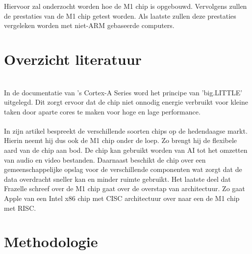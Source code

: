 \documentclass{hogent-article}
\begin{document}
Hiervoor zal onderzocht worden hoe de M1 chip is opgebouwd. Vervolgens zullen de prestaties van de M1 chip getest worden. Als laatste zullen deze prestaties vergeleken worden met niet-ARM gebaseerde computers.



\section{Overzicht literatuur}



\textcite{Apple2020} \\

In de documentatie van \textcite{ARM2014}'s Cortex-A Series word het principe van 'big.LITTLE' uitgelegd. Dit zorgt ervoor dat de chip niet onnodig energie verbruikt voor kleine taken door aparte cores te maken voor hoge en lage performance. \\

\textcite{Dalakoti2022} \\

In zijn artikel bespreekt \textcite{Frazelle2021} de verschillende soorten chips op de hedendaagse markt. Hierin neemt hij dus ook de M1 chip onder de loep. Zo brengt hij de flexibele aard van de chip aan bod. De chip kan gebruikt worden van AI tot het omzetten van audio en video bestanden. Daarnaast beschikt de chip over een gemeenschappelijke opslag voor de verschillende componenten wat zorgt dat de data overdracht sneller kan en minder ruimte gebruikt. Het laatste deel dat Frazelle schreef over de M1 chip gaat over de overstap van architectuur. Zo gaat Apple van een Intel x86 chip met CISC architectuur over naar een de M1 chip met RISC.  \\

\section{Methodologie}

\end{document}
